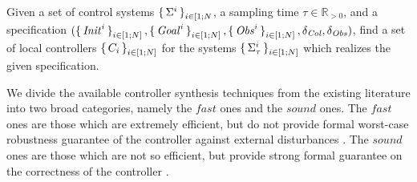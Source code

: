 \begin{comment}
 \item for \emph{every} $k\leq K$ and every $1\leq i\le N$ we have $D(x^i_k,obs)>\delta_{\obs}$.
 
 \end{itemize}
 For a given control system $\Sigma$, the targetted problem is denoted by a tuple $(x_0, \reach,\obs, \delta_{\obs},\delta_{\col})$. In linear temporal logic (LTL) notation \cite{baier2008principles}, the above conditions can be succinctly written as:
\begin{equation}\label{eq:spec}
	x_0 \wedge ([\bigwedge_{1\leq i\leq N}D(x^i,\obs)>\delta_{obs}\; \bigwedge_{1\leq i,j\leq N\;i\neq j}  d(x^i,x^j)>\delta_{\col}]\; \mathcal{U}\;\reach) .
\end{equation}
\end{comment}

\begin{problem}\label{prob:reach-avoid}
	Given a set of control systems $\set{\Sigma^i}_{i\in [1;N}$, a sampling time $\tau\in \mathbb{R}_{>0}$, and a specification $(\set{\mathit{Init}^i}_{i\in [1;N]}, \set{\mathit{Goal}^i}_{i\in [1;N]}, \set{\mathit{Obs}^i}_{i\in [1;N]}, \delta_{\mathit{Col}}, \delta_{\mathit{Obs}})$, find a set of local controllers $\set{C_i}_{i\in [1;N]}$ for the systems $\set{\Sigma_\tau^i}_{i\in [1;N]}$ which realizes the given specification.
\end{problem}


We divide the available controller synthesis techniques from the existing literature into two broad categories, namely the $\mathit{fast}$ ones and the $\mathit{sound}$ ones.
The $\mathit{fast}$ ones are those which are extremely efficient, but do not provide formal worst-case robustness guarantee of the controller against external disturbances \cite{howell2019altro,choset2005principles}.
The $\mathit{sound}$ ones are those which are not so efficient, but provide strong formal guarantee on the correctness of the controller \cite{reissig2016feedback,fisac2015reach,tedrake2009lqr}.

